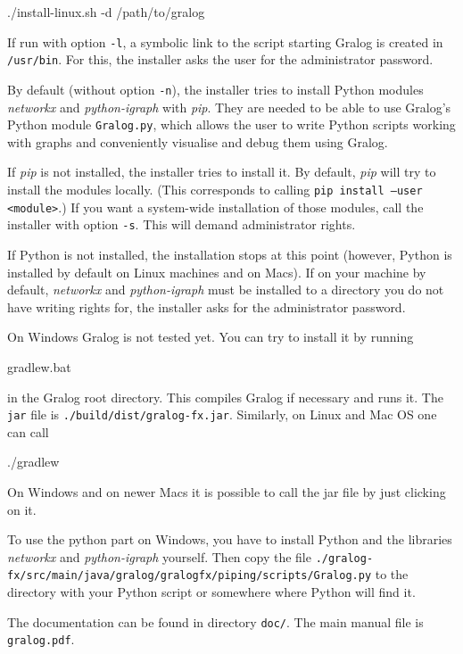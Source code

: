 \documentclass{article}
\begin{document}
\begin{tcolorbox}
  ./install-linux.sh -d /path/to/gralog
\end{tcolorbox}

If run with option \texttt{-l}, a symbolic link to the script starting Gralog is created in
\texttt{/usr/bin}. For this, the installer asks the user for the administrator
password.

By default (without option \texttt{-n}), the installer tries to
install Python modules \emph{networkx} and \emph{python-igraph} with
\emph{pip}. They are needed to be able to use Gralog's Python module
\texttt{Gralog.py}, which allows the user to write Python scripts
working with graphs and conveniently visualise and debug them using
Gralog.

If \emph{pip} is not installed, the installer tries to install it. By
default, \emph{pip} will try to install the modules locally. (This
corresponds to calling \texttt{pip install --user <module>}.) If you
want a system-wide installation of those modules, call the installer
with option \texttt{-s}. This will demand administrator rights.

If
Python is not installed, the installation stops at this point
(however, Python is installed by default on Linux machines and on
Macs). If on your machine by default, \emph{networkx} and
\emph{python-igraph} must be installed to a directory you do not have
writing rights for, the installer asks for the administrator password.


On Windows Gralog is not tested yet. You can try to install it by
running

\begin{tcolorbox}
  gradlew.bat
\end{tcolorbox}
in the Gralog root directory. This compiles Gralog if necessary and
runs it. The \texttt{jar} file is
\texttt{./build/dist/gralog-fx.jar}. Similarly, on Linux and Mac OS
one can call
\begin{tcolorbox}
  ./gradlew
\end{tcolorbox}

On Windows and on newer Macs it is possible to call the jar file by
just clicking on it.

To use the python part on Windows, you have to install Python and the
libraries \emph{networkx} and \emph{python-igraph} yourself. Then copy
the file
\texttt{./gralog-fx/src/main/java/gralog/gralogfx/piping/scripts/Gralog.py}
to the directory with your Python script or somewhere where Python
will find it.


The documentation can be found in directory \texttt{doc/}. The main
manual file is \texttt{gralog.pdf}. 






\end{document}
